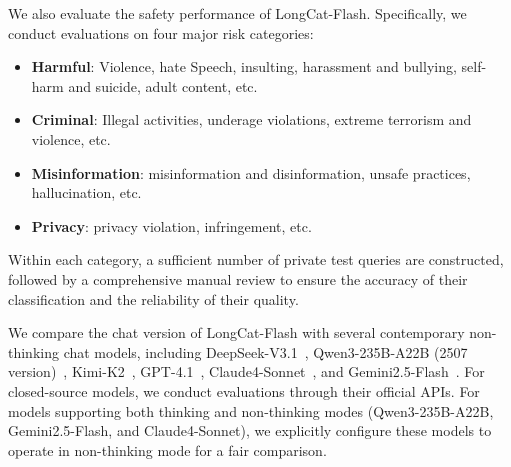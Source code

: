 \documentclass{article}
\newcommand{\longcat}{LongCat-Flash\xspace}
\begin{document}
We also evaluate the safety performance of \longcat. Specifically, we conduct evaluations on four major risk categories:
\begin{itemize}
    \item \textbf{Harmful}: Violence, hate Speech, insulting, harassment and bullying, self-harm and suicide, adult content, etc. 
    \item \textbf{Criminal}: Illegal activities, underage violations, extreme terrorism and violence, etc. 
    \item \textbf{Misinformation}: misinformation and disinformation, unsafe practices, hallucination, etc. 
    \item \textbf{Privacy}: privacy violation, infringement, etc.
\end{itemize}

Within each category, a sufficient number of private test queries are constructed, followed by a comprehensive manual review to ensure the accuracy of their classification and the reliability of their quality.

We compare the chat version of \longcat with several contemporary non-thinking chat models, including DeepSeek-V3.1~\citep{deepseekai2025deepseekv3technicalreport}, Qwen3-235B-A22B (2507 version)~\citep{yang2025qwen3}, Kimi-K2~\citep{Kimi_K2_web_doc}, GPT-4.1~\citep{gpt4.1}, Claude4-Sonnet~\citep{claude4}, and Gemini2.5-Flash~\citep{comanici2025gemini}. For closed-source models, we conduct evaluations through their official APIs. For models supporting both thinking and non-thinking modes (Qwen3-235B-A22B, Gemini2.5-Flash, and Claude4-Sonnet), we explicitly configure these models to operate in non-thinking mode for a fair comparison.
\end{document}
